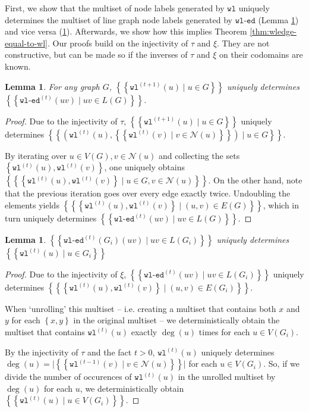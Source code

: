 \documentclass{article}
\newtheorem{lemma}[theorem]{Lemma}
\newcommand{\set}[1]{\left\{#1\right\}}
\newcommand{\multiset}[1]{\left\{\!\!\left\{#1\right\}\!\!\right\}}
\newcommand{\iter}[1]{^{(#1)}}
\newcommand{\wl}{\texttt{wl}}
\newcommand{\wledge}{\texttt{wl-ed}}
\newcommand{\dec}{\xi}
\newcommand{\hash}{\tau}
\newcommand{\nbh}{\mathcal{N}}
\begin{document}

First, we show that the multiset of node labels generated by $\wl$ uniquely determines the multiset of line graph node labels generated by $\wledge$ (Lemma \ref{lemma:wl-determines-wledge}) and vice versa (\ref{lemma:wledge-determines-wl}). Afterwards, we show how this implies Theorem \ref{thm:wledge-equal-to-wl}. Our proofs build on the injectivity of $\hash$ and $\dec$. They are not constructive, but can be made so if the inverses of $\hash$ and $\dec$ on their codomains are known.

\begin{lemma}   \label{lemma:wl-determines-wledge}
    For any graph $G$, $\multiset{\wl\iter{t+1}(u) \mid u\in G}$ uniquely determines $\multiset{\wledge\iter{t}(uv) \mid uv\in L(G)}$.
\end{lemma}
\begin{proof}
    Due to the injectivity of $\hash$,
    $\multiset{\wl\iter{t+1}(u) \mid u\in G}$
    uniquely determines
    $\multiset{\left(
        \wl\iter{t}(u),
        \multiset{\wl\iter{t}(v) \mid v\in \nbh(u)}
    \right) \mid u\in G}$.

    By iterating over $u\in V(G), v\in\nbh(u)$ and collecting the sets $\set{\wl\iter{t}(u), \wl\iter{t}(v)}$, one uniquely obtains $\multiset{\set{\wl\iter{t}(u), \wl\iter{t}(v)} \mid u\in G, v\in\nbh(u)}$.
    On the other hand, note that the previous iteration goes over every edge exactly twice. Undoubling the elements yields $\multiset{\set{\wl\iter{t}(u), \wl\iter{t}(v)} \mid (u,v)\in E(G)}$, which in turn uniquely determines $\multiset{\wledge\iter{t}(uv) \mid uv\in L(G)}$.

\end{proof}

\begin{lemma}   \label{lemma:wledge-determines-wl}
    $\multiset{\wledge\iter{t}(G_i)(uv) \mid uv\in L(G_i)}$ uniquely determines $\multiset{\wl\iter{t}(u) \mid u\in G_i}$
\end{lemma}
\begin{proof}
    Due to the injectivity of $\dec$,
    $\multiset{\wledge\iter{t}(uv) \mid uv\in L(G_i)}$
    uniquely determines
    $\multiset{\set{\wl\iter{t}(u), \wl\iter{t}(v)} \mid (u,v)\in E(G_i)}$.

    When `unrolling' this multiset -- i.e. creating a multiset that contains both $x$ and $y$ for each $\set{x,y}$ in the original multiset -- we deterministically obtain the multiset that contains $\wl\iter{t}(u)$ exactly $\deg(u)$ times for each $u\in V(G_i)$.

    By the injectivity of $\hash$ and the fact $t>0$, $\wl\iter{t}(u)$ uniquely determines $\deg(u) = \lvert\multiset{\wl\iter{t-1}(v) \mid v\in \nbh(u)}\rvert$ for each $u\in V(G_i)$. So, if we divide the number of occurences of $\wl\iter{t}(u)$ in the unrolled multiset by $\deg(u)$ for each $u$, we deterministically obtain $\multiset{\wl\iter{t}(u) \mid u\in V(G_i)}$.
\end{proof}
\end{document}
